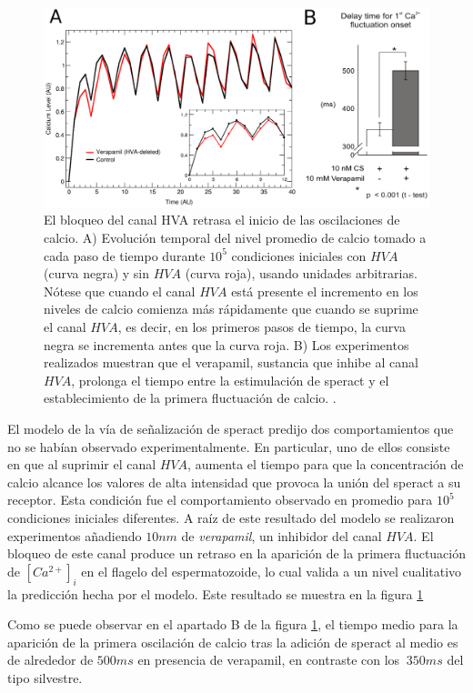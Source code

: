 \begin{figure}[hbt]
\includegraphics[width=0.9\linewidth]{gfx/figura8Chucho}
\caption[El bloqueo del canal HVA retrasa el inicio de las oscilaciones de calcio]{El bloqueo del canal HVA retrasa el inicio de las oscilaciones de calcio. A) Evolución temporal del nivel promedio de calcio tomado a cada paso de tiempo durante $10^5$ condiciones iniciales con $HVA$ (curva negra) y sin $HVA$ (curva roja), usando unidades arbitrarias. Nótese que cuando el canal $HVA$ está presente el incremento en los niveles de calcio comienza más rápidamente que cuando se suprime el canal $HVA$, es decir, en los primeros pasos de tiempo, la curva negra se incrementa antes que la curva roja. B) Los experimentos realizados muestran que el verapamil, sustancia que inhibe al canal $HVA$, prolonga el tiempo entre la estimulación de speract y el establecimiento de la primera fluctuación de calcio. \citeauthor{Espinal2011} \citep{Espinal2011}.}\label{fig:verapamil}
\end{figure}

El modelo de la vía de señalización de speract predijo dos comportamientos que no se habían observado experimentalmente. En particular, uno de ellos consiste en que al suprimir el canal $HVA$, aumenta el tiempo para que la concentración de calcio alcance los valores de alta intensidad que provoca la unión del speract a su receptor. Esta condición fue el comportamiento observado en promedio para $10^5$ condiciones iniciales diferentes. A raíz de este resultado del modelo se realizaron experimentos añadiendo $10  nm$ de \emph{verapamil}, un inhibidor del canal $HVA$. El bloqueo de este canal produce un retraso en la aparición de la primera fluctuación de $[Ca^{2+}]_i$ en el flagelo del espermatozoide, lo cual valida a un nivel cualitativo la predicción hecha por el modelo. Este resultado se muestra en la figura \ref{fig:verapamil}

Como se puede observar en el apartado B de la figura \ref{fig:verapamil}, el tiempo medio para la aparición de la primera oscilación de calcio tras la adición de speract al medio es de alrededor de $500 ms$ en presencia de verapamil, en contraste con los $~350 ms$ del tipo silvestre. 

